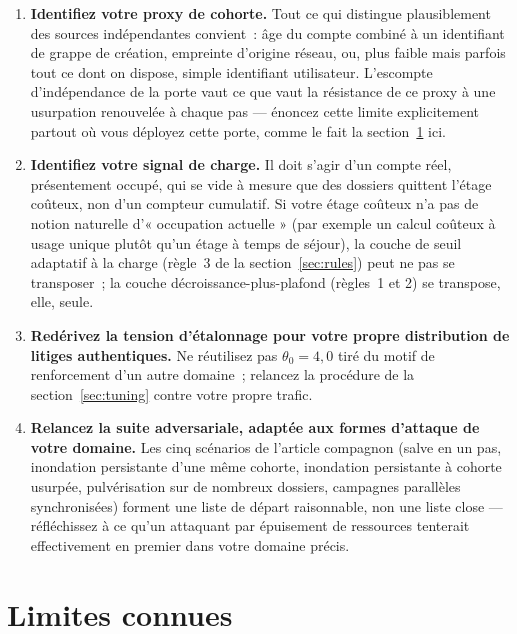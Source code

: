 \documentclass[11pt]{article}
\begin{document}
\begin{enumerate}
\item \textbf{Identifiez votre proxy de cohorte.} Tout ce qui distingue
  plausiblement des sources indépendantes convient~: âge du compte
  combiné à un identifiant de grappe de création, empreinte d'origine
  réseau, ou, plus faible mais parfois tout ce dont on dispose, simple
  identifiant utilisateur. L'escompte d'indépendance de la porte vaut ce
  que vaut la résistance de ce proxy à une usurpation renouvelée à
  chaque pas --- énoncez cette limite explicitement partout où vous
  déployez cette porte, comme le fait la section~\ref{sec:limites} ici.
\item \textbf{Identifiez votre signal de charge.} Il doit s'agir d'un
  compte réel, présentement occupé, qui se vide à mesure que des dossiers
  quittent l'étage coûteux, non d'un compteur cumulatif. Si votre étage
  coûteux n'a pas de notion naturelle d'« occupation actuelle » (par
  exemple un calcul coûteux à usage unique plutôt qu'un étage à temps de
  séjour), la couche de seuil adaptatif à la charge (règle~3 de la
  section~\ref{sec:rules}) peut ne pas se transposer~; la couche
  décroissance-plus-plafond (règles~1 et 2) se transpose, elle, seule.
\item \textbf{Redérivez la tension d'étalonnage pour votre propre
  distribution de litiges authentiques.} Ne réutilisez pas
  $\theta_0=4{,}0$ tiré du motif de renforcement d'un autre domaine~;
  relancez la procédure de la section~\ref{sec:tuning} contre votre
  propre trafic.
\item \textbf{Relancez la suite adversariale, adaptée aux formes
  d'attaque de votre domaine.} Les cinq scénarios de l'article compagnon
  (salve en un pas, inondation persistante d'une même cohorte,
  inondation persistante à cohorte usurpée, pulvérisation sur de
  nombreux dossiers, campagnes parallèles synchronisées) forment une
  liste de départ raisonnable, non une liste close --- réfléchissez à ce
  qu'un attaquant par épuisement de ressources tenterait effectivement
  en premier dans votre domaine précis.
\end{enumerate}

\section{Limites connues}
\label{sec:limites}
\end{document}
